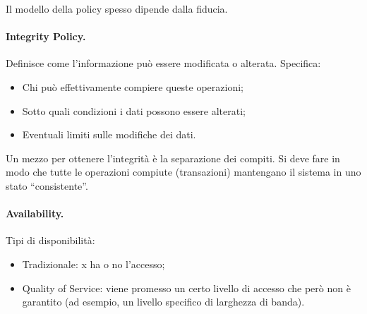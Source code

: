 Il modello della policy spesso dipende dalla fiducia.

\paragraph{Integrity Policy.}

Definisce come l'informazione può essere modificata o alterata.
Specifica:
\begin{itemize}
      \item Chi può effettivamente compiere queste operazioni;
      \item Sotto quali condizioni i dati possono essere alterati;
      \item Eventuali limiti sulle modifiche dei dati.
\end{itemize}

Un mezzo per ottenere l'integrità è la separazione dei compiti.
Si deve fare in modo che tutte le operazioni compiute (transazioni) mantengano il sistema in uno
stato “consistente”.

\paragraph{Availability.}

Tipi di disponibilità:
\begin{itemize}
      \item Tradizionale: x ha o no l'accesso;
      \item Quality of Service: viene promesso un certo livello di accesso
            che però non è garantito (ad esempio, un livello
            specifico di larghezza di banda).
\end{itemize}

